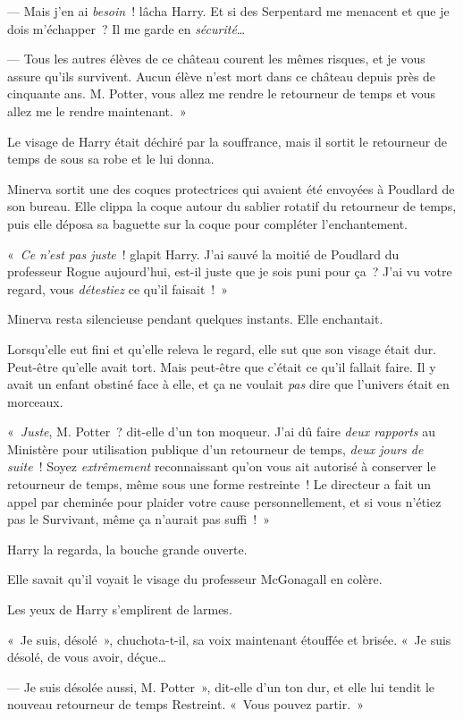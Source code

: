 --- Mais j'en ai \emph{besoin}~! lâcha Harry.
Et si des Serpentard me menacent et que je dois m'échapper~?
Il me garde en \emph{sécurité}…

--- Tous les autres élèves de ce château courent les mêmes risques, et je vous assure qu'ils survivent.
Aucun élève n'est mort dans ce château depuis près de cinquante ans.
M. Potter, vous allez me rendre le retourneur de temps et vous allez me le rendre maintenant.~»

Le visage de Harry était déchiré par la souffrance, mais il sortit le retourneur de temps de sous sa robe et le lui donna.

Minerva sortit une des coques protectrices qui avaient été envoyées à Poudlard de son bureau.
Elle clippa la coque autour du sablier rotatif du retourneur de temps, puis elle déposa sa baguette sur la coque pour compléter l'enchantement.

«~\emph{Ce n'est pas juste}~! glapit Harry.
J'ai sauvé la moitié de Poudlard du professeur Rogue aujourd'hui, est-il juste que je sois puni pour ça~?
J'ai vu votre regard, vous \emph{détestiez} ce qu'il faisait~!~»

Minerva resta silencieuse pendant quelques instants.
Elle enchantait.

Lorsqu'elle eut fini et qu'elle releva le regard, elle sut que son visage était dur.
Peut-être qu'elle avait tort.
Mais peut-être que c'était ce qu'il fallait faire.
Il y avait un enfant obstiné face à elle, et ça ne voulait \emph{pas} dire que l'univers était en morceaux.

«~\emph{Juste}, M. Potter~? dit-elle d'un ton moqueur.
J'ai dû faire \emph{deux rapports} au Ministère pour utilisation publique d'un retourneur de temps, \emph{deux jours de suite}~!
Soyez \emph{extrêmement} reconnaissant qu'on vous ait autorisé à conserver le retourneur de temps, même sous une forme restreinte~!
Le directeur a fait un appel par cheminée pour plaider votre cause personnellement, et si vous n'étiez pas le Survivant, même ça n'aurait pas suffi~!~»

Harry la regarda, la bouche grande ouverte.

Elle savait qu'il voyait le visage du professeur McGonagall en colère.

Les yeux de Harry s'emplirent de larmes.

«~Je suis, désolé~», chuchota-t-il, sa voix maintenant étouffée et brisée.
«~Je suis désolé, de vous avoir, déçue…

--- Je suis désolée aussi, M. Potter~», dit-elle d'un ton dur, et elle lui tendit le nouveau retourneur de temps Restreint.
«~Vous pouvez partir.~»

